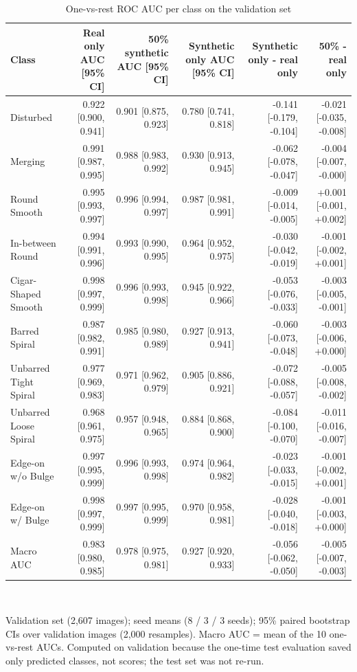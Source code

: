 \begin{table}[t]
\centering
\footnotesize
\caption{One-vs-rest ROC AUC per class on the validation set}
\label{tab:t14_roc_auc_val}
\begin{tabular}{lrrrrr}
\toprule
Class & Real only AUC [95\% CI] & 50\% synthetic AUC [95\% CI] & Synthetic only AUC [95\% CI] & Synthetic only - real only & 50\% - real only \\
\midrule
Disturbed & 0.922 [0.900, 0.941] & 0.901 [0.875, 0.923] & 0.780 [0.741, 0.818] & -0.141 [-0.179, -0.104] & -0.021 [-0.035, -0.008] \\
Merging & 0.991 [0.987, 0.995] & 0.988 [0.983, 0.992] & 0.930 [0.913, 0.945] & -0.062 [-0.078, -0.047] & -0.004 [-0.007, -0.000] \\
Round Smooth & 0.995 [0.993, 0.997] & 0.996 [0.994, 0.997] & 0.987 [0.981, 0.991] & -0.009 [-0.014, -0.005] & +0.001 [-0.001, +0.002] \\
In-between Round & 0.994 [0.991, 0.996] & 0.993 [0.990, 0.995] & 0.964 [0.952, 0.975] & -0.030 [-0.042, -0.019] & -0.001 [-0.002, +0.001] \\
Cigar-Shaped Smooth & 0.998 [0.997, 0.999] & 0.996 [0.993, 0.998] & 0.945 [0.922, 0.966] & -0.053 [-0.076, -0.033] & -0.003 [-0.005, -0.001] \\
Barred Spiral & 0.987 [0.982, 0.991] & 0.985 [0.980, 0.989] & 0.927 [0.913, 0.941] & -0.060 [-0.073, -0.048] & -0.003 [-0.006, +0.000] \\
Unbarred Tight Spiral & 0.977 [0.969, 0.983] & 0.971 [0.962, 0.979] & 0.905 [0.886, 0.921] & -0.072 [-0.088, -0.057] & -0.005 [-0.008, -0.002] \\
Unbarred Loose Spiral & 0.968 [0.961, 0.975] & 0.957 [0.948, 0.965] & 0.884 [0.868, 0.900] & -0.084 [-0.100, -0.070] & -0.011 [-0.016, -0.007] \\
Edge-on w/o Bulge & 0.997 [0.995, 0.999] & 0.996 [0.993, 0.998] & 0.974 [0.964, 0.982] & -0.023 [-0.033, -0.015] & -0.001 [-0.002, +0.001] \\
Edge-on w/ Bulge & 0.998 [0.997, 0.999] & 0.997 [0.995, 0.999] & 0.970 [0.958, 0.981] & -0.028 [-0.040, -0.018] & -0.001 [-0.003, +0.000] \\
Macro AUC & 0.983 [0.980, 0.985] & 0.978 [0.975, 0.981] & 0.927 [0.920, 0.933] & -0.056 [-0.062, -0.050] & -0.005 [-0.007, -0.003] \\
\bottomrule
\end{tabular}
\\[2pt]\parbox{\linewidth}{\scriptsize Validation set (2,607 images); seed means (8 / 3 / 3 seeds); 95\% paired bootstrap CIs over validation images (2,000 resamples). Macro AUC = mean of the 10 one-vs-rest AUCs. Computed on validation because the one-time test evaluation saved only predicted classes, not scores; the test set was not re-run.}
\end{table}
